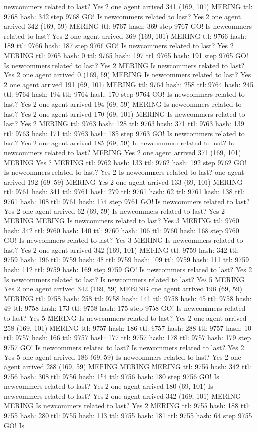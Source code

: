 newcommers related to last? Yes 2 one agent arrived 341 (169, 101) MERING ttl: 9768 hash: 342 step 9768 GO! Is newcommers related to last? Yes 2 one agent arrived 342 (169, 59) MERING ttl: 9767 hash: 369 step 9767 GO! Is newcommers related to last? Yes 2 one agent arrived 369 (169, 101) MERING ttl: 9766 hash: 189 ttl: 9766 hash: 187 step 9766 GO! Is newcommers related to last? Yes 2 MERING ttl: 9765 hash: 0 ttl: 9765 hash: 197 ttl: 9765 hash: 191 step 9765 GO! Is newcommers related to last? Yes 2 MERING Is newcommers related to last? Yes 2 one agent arrived 0 (169, 59) MERING Is newcommers related to last? Yes 2 one agent arrived 191 (69, 101) MERING ttl: 9764 hash: 258 ttl: 9764 hash: 245 ttl: 9764 hash: 194 ttl: 9764 hash: 170 step 9764 GO! Is newcommers related to last? Yes 2 one agent arrived 194 (69, 59) MERING Is newcommers related to last? Yes 2 one agent arrived 170 (69, 101) MERING Is newcommers related to last? Yes 2 MERING ttl: 9763 hash: 128 ttl: 9763 hash: 371 ttl: 9763 hash: 139 ttl: 9763 hash: 171 ttl: 9763 hash: 185 step 9763 GO! Is newcommers related to last? Yes 2 one agent arrived 185 (69, 59) Is newcommers related to last? Is newcommers related to last? MERING Yes 2 one agent arrived 371 (169, 101) MERING Yes 3 MERING ttl: 9762 hash: 133 ttl: 9762 hash: 192 step 9762 GO! Is newcommers related to last? Yes 2 Is newcommers related to last? one agent arrived 192 (69, 59) MERING Yes 2 one agent arrived 133 (69, 101) MERING ttl: 9761 hash: 341 ttl: 9761 hash: 279 ttl: 9761 hash: 62 ttl: 9761 hash: 138 ttl: 9761 hash: 108 ttl: 9761 hash: 174 step 9761 GO! Is newcommers related to last? Yes 2 one agent arrived 62 (69, 59) Is newcommers related to last? Yes 2 MERING MERING Is newcommers related to last? Yes 3 MERING ttl: 9760 hash: 342 ttl: 9760 hash: 140 ttl: 9760 hash: 106 ttl: 9760 hash: 168 step 9760 GO! Is newcommers related to last? Yes 3 MERING Is newcommers related to last? Yes 2 one agent arrived 342 (169, 101) MERING ttl: 9759 hash: 342 ttl: 9759 hash: 196 ttl: 9759 hash: 48 ttl: 9759 hash: 109 ttl: 9759 hash: 111 ttl: 9759 hash: 112 ttl: 9759 hash: 169 step 9759 GO! Is newcommers related to last? Yes 2 Is newcommers related to last? Is newcommers related to last? Yes 5 MERING Yes 2 one agent arrived 342 (169, 59) MERING one agent arrived 196 (69, 59) MERING ttl: 9758 hash: 258 ttl: 9758 hash: 141 ttl: 9758 hash: 45 ttl: 9758 hash: 49 ttl: 9758 hash: 173 ttl: 9758 hash: 175 step 9758 GO! Is newcommers related to last? Yes 5 MERING Is newcommers related to last? Yes 2 one agent arrived 258 (169, 101) MERING ttl: 9757 hash: 186 ttl: 9757 hash: 288 ttl: 9757 hash: 10 ttl: 9757 hash: 166 ttl: 9757 hash: 177 ttl: 9757 hash: 178 ttl: 9757 hash: 179 step 9757 GO! Is newcommers related to last? Is newcommers related to last? Yes 2 Yes 5 one agent arrived 186 (69, 59) Is newcommers related to last? Yes 2 one agent arrived 288 (169, 59) MERING MERING MERING ttl: 9756 hash: 342 ttl: 9756 hash: 308 ttl: 9756 hash: 154 ttl: 9756 hash: 180 step 9756 GO! Is newcommers related to last? Yes 2 one agent arrived 180 (69, 101) Is newcommers related to last? Yes 2 one agent arrived 342 (169, 101) MERING MERING Is newcommers related to last? Yes 2 MERING ttl: 9755 hash: 188 ttl: 9755 hash: 280 ttl: 9755 hash: 113 ttl: 9755 hash: 181 ttl: 9755 hash: 64 step 9755 GO! Is 